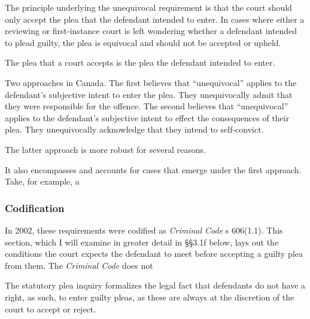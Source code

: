 The principle underlying the unequivocal requirement is that the court should only accept the plea that the defendant intended to enter. In cases where either a reviewing or first-instance court is left wondering whether a defendant intended to plead guilty, the plea is equivocal and should not be accepted or upheld. 

The plea that a court accepts is the plea the defendant intended to enter.

Two approaches in Canada. The first believes that ``unequivocal'' applies to the defendant's subjective intent to enter the plea. They unequivocally admit that they were responsible for the offence. The second believes that ``unequivocal'' applies to the defendant's subjective intent to effect the consequences of their plea. They unequivocally acknowledge that they intend to self-convict.

The latter approach is more robust for several reasons. 

It also encompasses and accounts for cases that emerge under the first approach. Take, for example, a

\subsubsection{Codification}

In 2002, these requirements were codified as \textit{Criminal Code} s 606(1.1). This section, which I will examine in greater detail in §§3.1f below, lays out the conditions the court expects the defendant to meet before accepting a guilty plea from them. The \textit{Criminal Code} does not 

The statutory plea inquiry formalizes the legal fact that defendants do not have a right, as such, to enter guilty pleas, as these are always at the discretion of the court to accept or reject.
